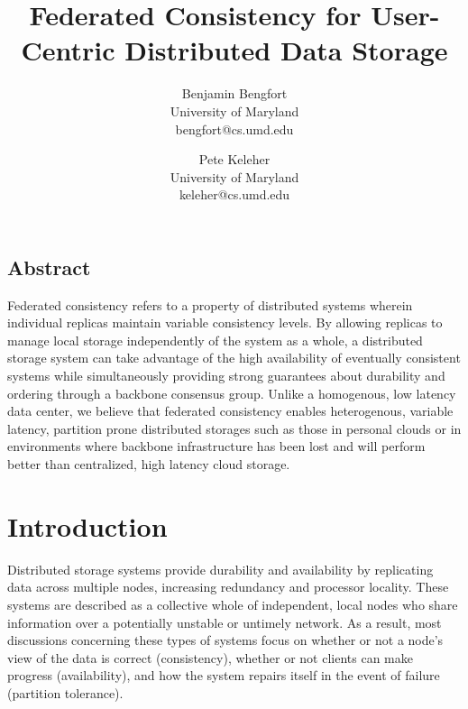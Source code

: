 \documentclass[letterpaper,twocolumn,10pt]{article}
\begin{document}
\date{}

\title{\Large \bf Federated Consistency for User-Centric Distributed Data Storage}

\author{
{\rm Benjamin Bengfort}\\
University of Maryland\\
bengfort@cs.umd.edu
\and
{\rm Pete Keleher}\\
University of Maryland\\
keleher@cs.umd.edu
} %

\maketitle



\subsection*{Abstract}

Federated consistency refers to a property of distributed systems wherein individual replicas maintain variable consistency levels. By allowing replicas to manage local storage independently of the system as a whole, a distributed storage system can take advantage of the high availability of eventually consistent systems while simultaneously providing strong guarantees about durability and ordering through a backbone consensus group. Unlike a homogenous, low latency data center, we believe that federated consistency enables heterogenous, variable latency, partition prone distributed storages such as those in personal clouds or in environments where backbone infrastructure has been lost and will perform better than centralized, high latency cloud storage.

\section{Introduction}


Distributed storage systems provide durability and availability by replicating data across multiple nodes, increasing redundancy and processor locality. These systems are described as a collective whole of independent, local nodes who share information over a potentially unstable or untimely network. As a result, most discussions concerning these types of systems focus on whether or not a node's view of the data is correct (consistency), whether or not clients can make progress (availability), and how the system repairs itself in the event of failure (partition tolerance).
\end{document}
